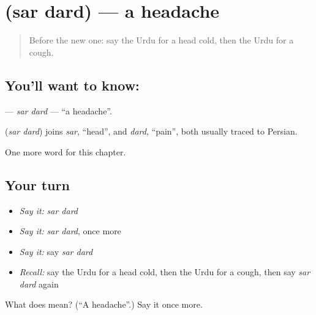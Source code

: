 \section[\texorpdfstring{\ur{سر} \ur{درد} (sar dard)}{سر درد (sar dard)}]{  (sar dard) — a headache}

\label{lesson:UR-C152-sar-dard}



\begin{quote}
Before the new one: say the Urdu for a head cold, then the Urdu for a cough.
\end{quote}

\subsection*{You'll want to know:  }
\textbf{ } — \emph{sar dard} — \textquotedblleft{}a headache\textquotedblright{}.

\begin{cousinweb}
\textbf{ } (\emph{sar dard}) joins \emph{sar}, \textquotedblleft{}head\textquotedblright{}, and \emph{dard}, \textquotedblleft{}pain\textquotedblright{}, both usually traced to Persian.
\end{cousinweb}

\begin{grammarlens}[title={What you've built}]
One more word for this chapter.
\end{grammarlens}

\subsection*{Your turn}
\begin{itemize}
\raggedright
  \item \emph{Say it:} \emph{sar dard}
  \item \emph{Say it:} \emph{sar dard}, once more
  \item \emph{Say it:} say \emph{sar dard}
  \item \emph{Recall:} say the Urdu for a head cold, then the Urdu for a cough, then say \emph{sar dard} again
\end{itemize}

\begin{tcolorbox}[breakable,colback=teal!4,colframe=teal!35!black,title={Before you move on}]
What does   mean? (\textquotedblleft{}A headache\textquotedblright{}.) Say it once more.
\end{tcolorbox}
